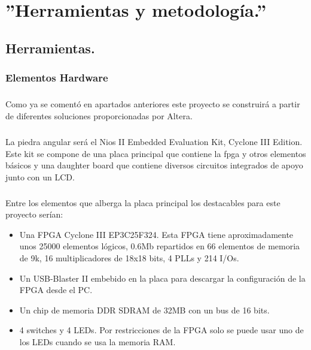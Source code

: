 \documentclass[a4paper,12pt,titlepage,final]{book}
\begin{document}
\chapter{''Herramientas y metodología.''}

\section{Herramientas.}
\subsection{Elementos Hardware}
\subsubsection*{}

\paragraph{}
Como ya se comentó en apartados anteriores este proyecto se construirá a partir de diferentes soluciones proporcionadas por Altera.

\paragraph{}
La piedra angular será el Nios II Embedded Evaluation Kit, Cyclone III Edition.
Este kit se compone de una placa principal que contiene la fpga y otros
elementos básicos y una daughter board que contiene diversos circuitos integrados
de apoyo junto con un LCD.

\paragraph{}
Entre los elementos que alberga la placa principal los destacables para este
proyecto serían:

\begin{itemize}
\item Una FPGA Cyclone III EP3C25F324. Esta FPGA tiene aproximadamente unos 25000 elementos lógicos, 0.6Mb repartidos en 66 elementos de memoria de 9k, 16 multiplicadores de 18x18 bits, 4 PLLs y 214 I/Os.

\item Un USB-Blaster II embebido en la placa para descargar la configuración de la FPGA desde el PC.

\item Un chip de memoria DDR SDRAM de 32MB con un bus de 16 bits.

\item 4 switches y 4 LEDs. Por restricciones de la FPGA solo se puede usar uno de los LEDs cuando se usa la memoria RAM.
\end{itemize}
\end{document}
